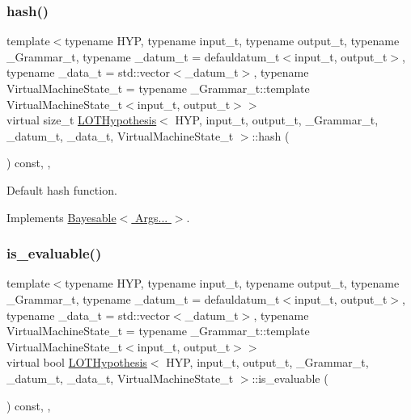 \mbox{\label{class_l_o_t_hypothesis_a7c33d51f8d81762b1eca7f86b596236a}} 
\subsubsection{\texorpdfstring{hash()}{hash()}}
{\footnotesize\ttfamily template$<$typename H\+YP, typename input\+\_\+t, typename output\+\_\+t, typename \+\_\+\+Grammar\+\_\+t, typename \+\_\+datum\+\_\+t = defauldatum\+\_\+t$<$input\+\_\+t, output\+\_\+t$>$, typename \+\_\+data\+\_\+t = std\+::vector$<$\+\_\+datum\+\_\+t$>$, typename Virtual\+Machine\+State\+\_\+t = typename \+\_\+\+Grammar\+\_\+t\+::template Virtual\+Machine\+State\+\_\+t$<$input\+\_\+t, output\+\_\+t$>$$>$ \\
virtual size\+\_\+t \hyperlink{class_l_o_t_hypothesis}{L\+O\+T\+Hypothesis}$<$ H\+YP, input\+\_\+t, output\+\_\+t, \+\_\+\+Grammar\+\_\+t, \+\_\+datum\+\_\+t, \+\_\+data\+\_\+t, Virtual\+Machine\+State\+\_\+t $>$\+::hash (\begin{DoxyParamCaption}{ }\end{DoxyParamCaption}) const\hspace{0.3cm}{\ttfamily [inline]}, {\ttfamily [override]}, {\ttfamily [virtual]}}



Default hash function. 



Implements \hyperlink{class_bayesable_a26f6d55e7526ebd897cbb27c757b611b}{Bayesable$<$ Args... $>$}.

\mbox{\label{class_l_o_t_hypothesis_a9eeaaf321324d2418405f4d7252f6ca4}} 
\subsubsection{\texorpdfstring{is\+\_\+evaluable()}{is\_evaluable()}}
{\footnotesize\ttfamily template$<$typename H\+YP, typename input\+\_\+t, typename output\+\_\+t, typename \+\_\+\+Grammar\+\_\+t, typename \+\_\+datum\+\_\+t = defauldatum\+\_\+t$<$input\+\_\+t, output\+\_\+t$>$, typename \+\_\+data\+\_\+t = std\+::vector$<$\+\_\+datum\+\_\+t$>$, typename Virtual\+Machine\+State\+\_\+t = typename \+\_\+\+Grammar\+\_\+t\+::template Virtual\+Machine\+State\+\_\+t$<$input\+\_\+t, output\+\_\+t$>$$>$ \\
virtual bool \hyperlink{class_l_o_t_hypothesis}{L\+O\+T\+Hypothesis}$<$ H\+YP, input\+\_\+t, output\+\_\+t, \+\_\+\+Grammar\+\_\+t, \+\_\+datum\+\_\+t, \+\_\+data\+\_\+t, Virtual\+Machine\+State\+\_\+t $>$\+::is\+\_\+evaluable (\begin{DoxyParamCaption}{ }\end{DoxyParamCaption}) const\hspace{0.3cm}{\ttfamily [inline]}, {\ttfamily [override]}, {\ttfamily [virtual]}}



